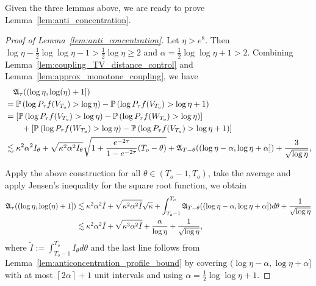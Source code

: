 \documentclass[11pt]{article}
\newcommand{\excess}{\alpha}
\newcommand{\fA}{\mathfrak{A}}
\newcommand{\btau}{\kappa}
\newcommand{\uV}{V}
\newcommand{\uW}{W}
\newcommand{\To}{{T_o}}
\theoremstyle{named}
\theoremstyle{plain}
\newcommand{\defn}{:=}
\newcommand{\Prob}{\ensuremath{{\mathbb{P}}}}
\newcommand{\brackets}[1]{\left[ #1 \right]}
\newcommand{\parenth}[1]{\left( #1 \right)}
\newcommand{\ceils}[1]{\left\lceil #1 \right \rceil}
\begin{document}
Given the three lemmas above, we are ready to prove Lemma~\ref{lem:anti_concentration}. 
\begin{proof}[Proof of Lemma~\ref{lem:anti_concentration}]
  Let $\eta > e^8$. Then $\log \eta - \frac12 \log \log \eta - 1 > \frac12 \log \eta \geq 2$ and $\excess = \frac12 \log \log \eta + 1 > 2$. Combining Lemma~\ref{lem:coupling_TV_distance_control} and Lemma~\ref{lem:approx_monotone_coupling}, we have
  \begin{align}
    \label{eq:anti_concentration_bound_bootstrap}
    &\quad \fA_\tau((\log \eta, \log(\eta) + 1]) \notag \\
    &= \Prob\parenth{\log P_{\tau} f(\uV_\To) > \log \eta }  -  \Prob\parenth{\log P_{\tau} f(\uV_\To) > \log \eta + 1} \notag \\
    &= \brackets{\Prob\parenth{\log P_{\tau} f(\uV_\To) > \log \eta } - \Prob\parenth{\log P_{\tau} f(\uW_\To) > \log \eta }} \notag \\
    &\quad \quad + \brackets{\Prob\parenth{\log P_{\tau} f(\uW_\To) > \log \eta } -  \Prob\parenth{\log P_{\tau} f(\uV_\To) > \log \eta + 1}} \notag \\
    &\lesssim \btau^2 \excess^2 I_\theta + \sqrt{\btau^2 \excess^2 I_\theta} \sqrt{1 + \frac{e^{-2\tau}}{1-e^{-2\tau}} (\To - \theta)} + \fA_{T-\theta}((\log \eta - \excess, \log \eta + \excess])  + \frac{3}{\sqrt{\log \eta}},
  \end{align}

  Apply the above construction for all $\theta \in (\To - 1, \To)$, take the average and apply Jensen's inequality for the square root function, we obtain
  \begin{align}
    \label{eq:anti_concentration_profile_bound_in_proof}
    \fA_\tau((\log \eta, \log(\eta) + 1]) &\lesssim \btau^2 \excess^2 \tilde{I} + \sqrt{\btau^2 \excess^2 \tilde{I}} \sqrt{\btau} + \int_{\To - 1}^{\To} \fA_{T-\theta}((\log \eta - \excess, \log \eta + \excess]) d\theta + \frac{1}{\sqrt{\log \eta}} \notag \\
    &\lesssim \btau^2 \excess^2 \tilde{I} + \sqrt{\btau^3 \excess^2 \tilde{I}} + \frac{\excess}{\log \eta} + \frac{1}{\sqrt{\log \eta}},
  \end{align}
  where $\tilde{I} \defn \int_{\To - 1}^{\To} I_\theta d\theta$ and the last line follows from Lemma~\ref{lem:anticoncentration_profile_bound} by covering $(\log \eta - \excess, \log \eta + \excess]$ with at most $\ceils{2\excess} + 1$ unit intervals and using $\excess = \frac12 \log \log \eta + 1$. 
  

\end{proof}
\end{document}
